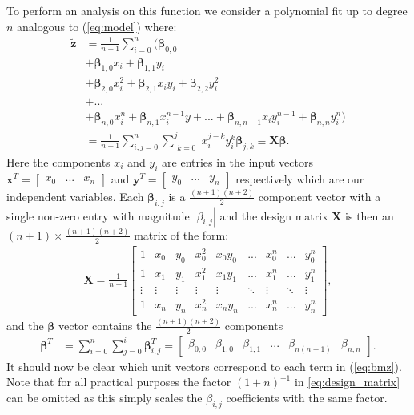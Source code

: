 \documentclass[%
reprint,
amsmath,amssymb,
aps,
pra,
]{revtex4-2}
\newcommand{\f}[2]{\frac{#1}{#2}}
\begin{document}
To perform an analysis on this function we consider a polynomial fit up to degree $n$ analogous to (\ref{eq:model}) where:
\begin{align}
	\tilde{\bm{z}}&=\f1{n+1}\sum_{i=0}^{n}\bigg(\bm\beta_{0,0}\nonumber\\
	&+\bm\beta_{1,0}x_i+\bm\beta_{1,1}y_i\nonumber\\
	&+\bm\beta_{2,0}x_i^2+\bm\beta_{2,1}x_iy_i+\bm\beta_{2,2}y_i^2\nonumber\\
	&+...\nonumber\\
	&+\bm\beta_{n,0}x_i^n+\bm\beta_{n,1}x_i^{n-1}y+...+\bm\beta_{n,n-1}x_iy_i^{n-1}+\bm\beta_{n,n}y_i^n\bigg)\nonumber\\
	&=\frac{1}{n+1}\sum_{i,j=0}^{n}\sum_{\substack{k=0}}^{j}x^{j-k}_i y^{k}_i\bm\beta_{j,k}\equiv \bm X\bm\beta.
	\label{eq:bmz}
\end{align}
Here the components $x_i$ and $y_i$ are entries in the input vectors $\bm x^T=\begin{bmatrix} x_0&...&x_n \end{bmatrix}$ and $\bm y^T=\begin{bmatrix} y_0& ...&y_n \end{bmatrix}$ respectively which are our independent variables. Each $\bm\beta_{i,j}$ is a $\frac{(n+1)(n+2)}{2}$ component vector with a single non-zero entry with magnitude $|\beta_{i,j}|$ and the design matrix $\bm X$ is then an $(n+1)\times\frac{(n+1)(n+2)}{2}$ matrix of the form:
\begin{align}
	\bm X=\frac{1}{n+1}\begin{bmatrix}
		1 & x_0 & y_0 & x^2_0 & x_0y_0 & ... & x_0^n & ... & y_0^n\\
		1 & x_1 & y_1 & x_1^2 & x_1y_1 & ... & x_1^n & ... & y_1^n\\
		\vdots & \vdots & \vdots & \vdots & \vdots & \ddots & \vdots & \ddots & \vdots\\
		1 & x_n & y_n & x_n^2 & x_ny_n & ... & x_n^n & ... & y_n^n
	\end{bmatrix},
	\label{eq:design_matrix}
\end{align}
and the $\bm\beta$ vector contains the $\frac{(n+1)(n+2)}{2}$ components 
\begin{align*}
	\bm\beta^T&=\sum_{i=0}^n\sum_{j=0}^i\bm\beta_{i,j}^T=\begin{bmatrix}
		\beta_{0,0}&\beta_{1,0}&\beta_{1,1}&...&\beta_{n(n-1)}&\beta_{n,n}
	\end{bmatrix}.
\end{align*}
It should now be clear which unit vectors correspond to each term in (\ref{eq:bmz}). Note that for all practical purposes the factor $(1+n)^{-1}$ in \eqref{eq:design_matrix} can be omitted as this simply scales the $\beta_{i,j}$ coefficients with the same factor.
\end{document}
